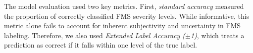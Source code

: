 \documentclass{vgtc}                          %
\newcommand{\kaiming}[1]{
        \textcolor{red}{{\em\bf Kaiming:} #1}}
\begin{document}

The model evaluation used two key metrics.  First, \textit{standard accuracy} measured the proportion of correctly classified FMS severity levels. While informative, this metric alone fails to account for inherent subjectivity and uncertainty in FMS labeling. Therefore, we also used \textit{Extended Label Accuracy ($\pm$1)}, which treats a prediction as correct if it falls within one level of the true label. %




\end{document}
